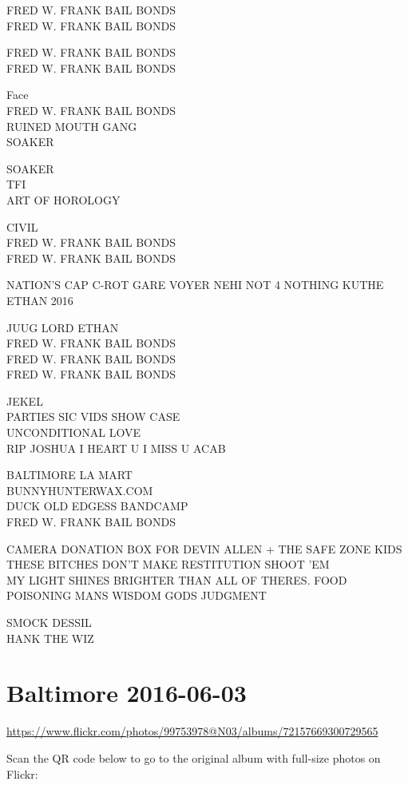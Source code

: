 \documentclass[10pt,letterpaper]{article}
\begin{document}
FRED W. FRANK BAIL BONDS\\
FRED W. FRANK BAIL BONDS

FRED W. FRANK BAIL BONDS\\
FRED W. FRANK BAIL BONDS

Face\\
FRED W. FRANK BAIL BONDS\\
RUINED MOUTH GANG\\
SOAKER

SOAKER\\
TFI\\
ART OF HOROLOGY

CIVIL\\
FRED W. FRANK BAIL BONDS\\
FRED W. FRANK BAIL BONDS

NATION'S CAP C{-}ROT GARE VOYER NEHI NOT 4 NOTHING KUTHE\\
ETHAN 2016

JUUG LORD ETHAN\\
FRED W. FRANK BAIL BONDS\\
FRED W. FRANK BAIL BONDS\\
FRED W. FRANK BAIL BONDS

JEKEL\\
PARTIES SIC VIDS SHOW CASE\\
UNCONDITIONAL LOVE\\
RIP JOSHUA I HEART U I MISS U ACAB

BALTIMORE LA MART\\
BUNNYHUNTERWAX.COM\\
DUCK OLD EDGESS BANDCAMP\\
FRED W. FRANK BAIL BONDS

CAMERA DONATION BOX FOR DEVIN ALLEN + THE SAFE ZONE KIDS\\
THESE BITCHES DON'T MAKE RESTITUTION SHOOT 'EM\\
MY LIGHT SHINES BRIGHTER THAN ALL OF THERES.  FOOD POISONING MANS WISDOM GODS JUDGMENT

SMOCK DESSIL\\
HANK THE WIZ


\section*{Baltimore 2016-06-03}

\url{https://www.flickr.com/photos/99753978@N03/albums/72157669300729565}

Scan the QR code below to go to the original album with full-size photos on Flickr:
\end{document}
